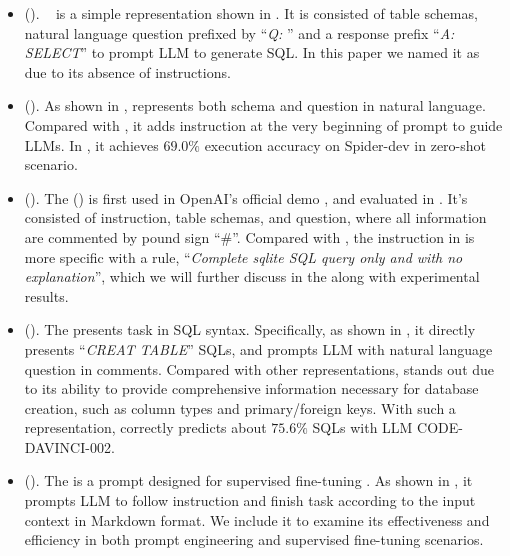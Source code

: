 \begin{itemize}
    \item \textbf{\bsprompt} (\abbsprompt). 
    \bsprompt~\cite{din-sql} is a simple representation shown in . 
    It is consisted of table schemas, natural language question prefixed by ``\textit{Q: }'' and a response prefix ``\textit{A: SELECT}'' to prompt LLM to generate SQL. 
    In this paper we named it as \bsprompt due to its absence of instructions.
    
    \item \textbf{\textprompt} (\abtextprompt). 
    As shown in , \textprompt \cite{enhancing} represents both schema and question in natural language.
    Compared with \bsprompt, it adds instruction at the very beginning of prompt to guide LLMs. In \cite{enhancing}, it achieves $69.0\%$ execution accuracy on Spider-dev in zero-shot scenario. 

    \item \textbf{\openaiprompt} (\abopenaiprompt). 
    The \openaiprompt () is first used in OpenAI's official \nlsql demo \cite{openaiprompt}, and evaluated in \cite{DBLP:journals/corr/abs-2303-13547, din-sql}. 
    It's consisted of instruction, table schemas, and question, where all information are commented by pound sign ``$\textit{\#}$''. 
    Compared with \textprompt, the instruction in \openaiprompt is more specific with a rule, ``\textit{Complete sqlite SQL query only and with no explanation}'', which we will further discuss in the  along with experimental results. 
    
    \item \textbf{\sqlprompt} (\absqlprompt). 
    The \sqlprompt \cite{DBLP:journals/corr/abs-2305-11853, enhancing} presents \nlsql task in SQL syntax. 
    Specifically, as shown in , it directly presents ``\textit{CREAT TABLE}'' SQLs, and prompts LLM with natural language question in comments. 
    Compared with other representations, \absqlprompt stands out due to its ability to provide comprehensive information necessary for database creation, such as column types and primary/foreign keys.
    With such a representation, \cite{enhancing} correctly predicts about $75.6\%$ SQLs with LLM CODE-DAVINCI-002. 
    
    \item \textbf{\alpacaprompt} (\abalpacaprompt). 
    The \alpacaprompt is a prompt designed for supervised fine-tuning \cite{alpaca}. 
    As shown in , it prompts LLM to follow instruction and finish task according to the input context in Markdown format. 
    We include it to examine its effectiveness and efficiency in both prompt engineering and supervised fine-tuning scenarios. 
    
\end{itemize}

